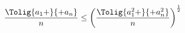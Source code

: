 \begin{equation*}
   \frac{\Tolig{a_{1}+}{+a_{n}}}{n} \le 
   {\left( \frac{\Tolig{a_{1}^{2}+}{+a_{n}^{2}}}{n} \right) }^{\frac{1}{2}}
\end{equation*}
